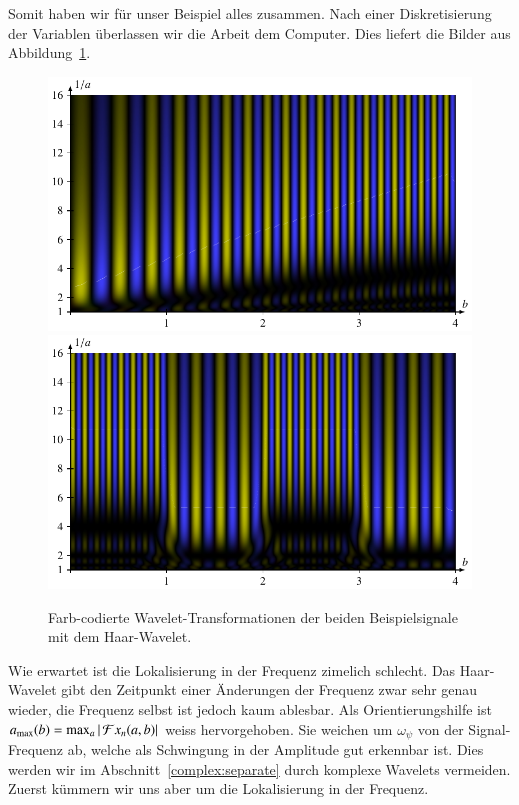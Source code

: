 Somit haben wir für unser Beispiel alles zusammen.
Nach einer Diskretisierung der Variablen überlassen wir die Arbeit dem Computer.
Dies liefert die Bilder aus Abbildung~\ref{complex:haar-ex}.
\begin{figure}
	\centering
	\includegraphics{papers/complex/images/chirp_haar.pdf}
	\includegraphics{papers/complex/images/square_haar.pdf}
	\caption{Farb-codierte Wavelet-Transformationen der beiden Beispielsignale mit dem Haar-Wavelet.}
	\label{complex:haar-ex}
\end{figure}

Wie erwartet ist die Lokalisierung in der Frequenz zimelich schlecht.
Das Haar-Wavelet gibt den Zeitpunkt einer Änderungen der Frequenz zwar sehr genau wieder, die Frequenz selbst ist jedoch kaum ablesbar.
Als Orientierungshilfe ist $a_\text{max} (b) = \max_a{|\Wave x_n(a,b)|}$ weiss hervorgehoben.
Sie weichen um $\omega_\psi$ von der Signal-Frequenz ab, welche als Schwingung in der Amplitude gut erkennbar ist.
Dies werden wir im Abschnitt~\ref{complex:separate} durch komplexe Wavelets vermeiden.
Zuerst kümmern wir uns aber um die Lokalisierung in der Frequenz.

